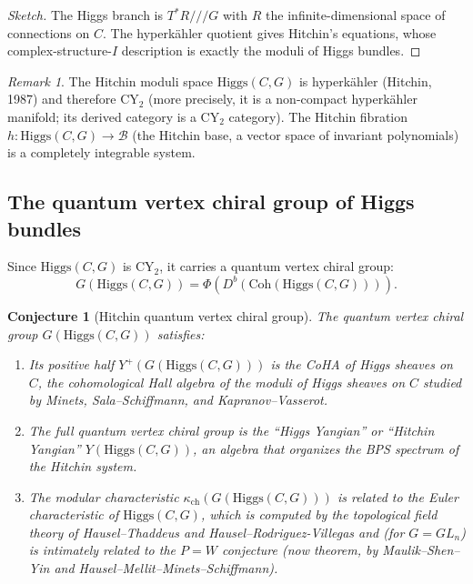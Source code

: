 \documentclass[11pt]{article}
\newtheorem{conjecture}[theorem]{Conjecture}
\theoremstyle{definition}
\theoremstyle{remark}
\newtheorem{remark}[theorem]{Remark}
\newcommand{\CY}{\mathrm{CY}}
\newcommand{\Coh}{\mathrm{Coh}}
\newcommand{\Higgs}{\mathrm{Higgs}}
\begin{document}
\begin{proof}[Sketch]
The Higgs branch is $T^*R \mathbin{/\!\!/\!\!/} G$ with $R$ the infinite-dimensional space of connections on $C$. The hyperk\"ahler quotient gives Hitchin's equations, whose complex-structure-$I$ description is exactly the moduli of Higgs bundles.
\end{proof}

\begin{remark}
\label{rem:higgs-cy2}
The Hitchin moduli space $\Higgs(C, G)$ is hyperk\"ahler (Hitchin, 1987) and therefore $\CY_2$ (more precisely, it is a non-compact hyperk\"ahler manifold; its derived category is a $\CY_2$ category). The Hitchin fibration $h \colon \Higgs(C,G) \to \mathcal{B}$ (the Hitchin base, a vector space of invariant polynomials) is a completely integrable system.
\end{remark}

\subsection{The quantum vertex chiral group of Higgs bundles}

Since $\Higgs(C, G)$ is $\CY_2$, it carries a quantum vertex chiral group:
\[
 G(\Higgs(C,G)) = \Phi(D^b(\Coh(\Higgs(C,G)))).
\]

\begin{conjecture}[Hitchin quantum vertex chiral group]
\label{conj:hitchin-qvcg}
The quantum vertex chiral group $G(\Higgs(C,G))$ satisfies:
\begin{enumerate}[label=(\roman*)]
 \item Its positive half $Y^+(G(\Higgs(C,G)))$ is the CoHA of Higgs sheaves on $C$, the cohomological Hall algebra of the moduli of Higgs sheaves on $C$ studied by Minets, Sala--Schiffmann, and Kapranov--Vasserot.

 \item The full quantum vertex chiral group is the ``Higgs Yangian'' or ``Hitchin Yangian'' $Y(\Higgs(C,G))$, an algebra that organizes the BPS spectrum of the Hitchin system.

 \item The modular characteristic $\kappa_{\mathrm{ch}}(G(\Higgs(C,G)))$ is related to the Euler characteristic of $\Higgs(C,G)$, which is computed by the topological field theory of Hausel--Thaddeus and Hausel--Rodriguez-Villegas and (for $G = GL_n$) is intimately related to the $P = W$ conjecture (now theorem, by Maulik--Shen--Yin and Hausel--Mellit--Minets--Schiffmann).
\end{enumerate}
\end{conjecture}
\end{document}
